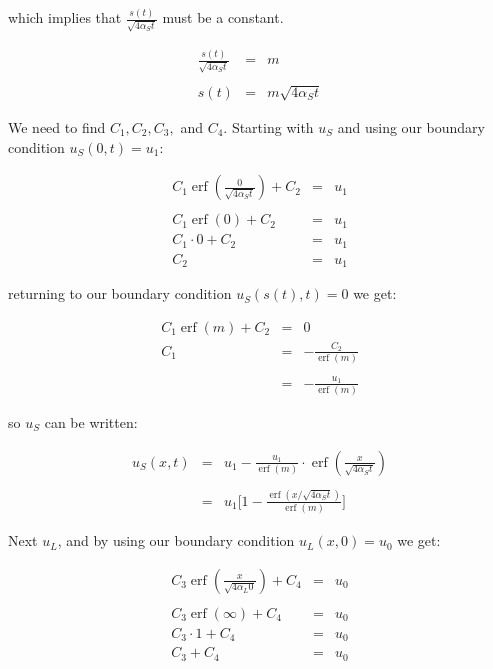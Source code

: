 \documentclass{report}
\DeclareMathOperator{\erf}{erf}
\begin{document}
which implies that $\frac{s(t)}{\sqrt{4 \alpha_S t}}$ must be a constant.\bigskip

\begin{eqnarray*}
  \frac{s(t)}{\sqrt{4 \alpha_S t}} & = & m \\\\
                              s(t) & = & m \sqrt{4 \alpha_S t}
\end{eqnarray*}\medskip



We need to find $C_1, C_2, C_3,$ and $C_4$. Starting with $u_S$ and using our boundary condition 
$u_S(0, t) = u_1$:\bigskip

\begin{eqnarray*} 
  C_1 \erf \left( \frac{0}{\sqrt{4 \alpha_S t}} \right) + C_2 & = & u_1 \\\\
                                           C_1 \erf (0) + C_2 & = & u_1 \\
                                            C_1 \cdot 0 + C_2 & = & u_1 \\
                                                          C_2 & = & u_1 
\end{eqnarray*}\medskip

returning to our boundary condition $u_S(s(t), t) = 0$ we get:\bigskip

\begin{eqnarray*}
  C_1 \erf (m) + C_2 & = & 0 \\
                 C_1 & = & - \frac{C_2}{\erf(m)} \\\\
                     & = & - \frac{u_1}{\erf(m)} 
\end{eqnarray*}\medskip

so $u_S$ can be written:\bigskip

\begin{eqnarray*}
  u_S(x, t) & = & u_1 - \frac{u_1}{\erf(m)} \cdot \erf \left( \frac{x}{\sqrt{4 \alpha_S t}} \right) \\\\
            & = & u_1 \Bigg[ 1 - \frac{\erf ( x / \sqrt{4 \alpha_S t} )}{\erf(m)}  \Bigg] 
\end{eqnarray*}\medskip



Next $u_L$, and by using our boundary condition $u_L(x, 0) = u_0$ we get:\bigskip

\begin{eqnarray*} 
  C_3 \erf \left( \frac{x}{\sqrt{4 \alpha_L 0}} \right) + C_4 & = & u_0 \\\\
                                    C_3 \erf ( \infty ) + C_4 & = & u_0 \\
                                            C_3 \cdot 1 + C_4 & = & u_0 \\
                                                    C_3 + C_4 & = & u_0 
\end{eqnarray*}\medskip
\end{document}
